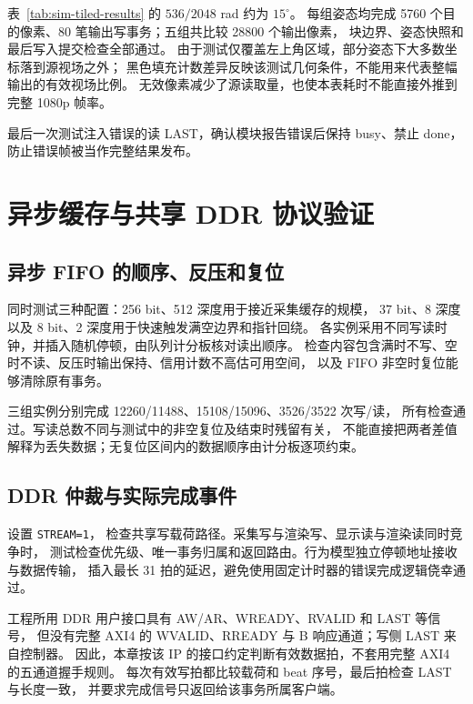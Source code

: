 表~\ref{tab:sim-tiled-results} 的 $536/2048$ rad 约为 $15^\circ$。
每组姿态均完成 5760 个目的像素、80 笔输出写事务；五组共比较 28800 个输出像素，
块边界、姿态快照和最后写入提交检查全部通过。
由于测试仅覆盖左上角区域，部分姿态下大多数坐标落到源视场之外；
黑色填充计数差异反映该测试几何条件，不能用来代表整幅输出的有效视场比例。
无效像素减少了源读取量，也使本表耗时不能直接外推到完整 1080p 帧率。

最后一次测试注入错误的读 LAST，确认模块报告错误后保持 busy、禁止 done，
防止错误帧被当作完整结果发布。

\section{异步缓存与共享 DDR 协议验证}
\subsection{异步 FIFO 的顺序、反压和复位}
 同时测试三种配置：256 bit、512 深度用于接近采集缓存的规模，
37 bit、8 深度以及 8 bit、2 深度用于快速触发满空边界和指针回绕。
各实例采用不同写读时钟，并插入随机停顿，由队列计分板核对读出顺序。
检查内容包含满时不写、空时不读、反压时输出保持、信用计数不高估可用空间，
以及 FIFO 非空时复位能够清除原有事务。

三组实例分别完成 12260/11488、15108/15096、3526/3522 次写/读，
所有检查通过。写读总数不同与测试中的非空复位及结束时残留有关，
不能直接把两者差值解释为丢失数据；无复位区间内的数据顺序由计分板逐项约束。

\subsection{DDR 仲裁与实际完成事件}
 设置 \texttt{STREAM=1}，
检查共享写载荷路径。采集写与渲染写、显示读与渲染读同时竞争时，
测试检查优先级、唯一事务归属和返回路由。行为模型独立停顿地址接收与数据传输，
插入最长 31 拍的延迟，避免使用固定计时器的错误完成逻辑侥幸通过。

工程所用 DDR 用户接口具有 AW/AR、WREADY、RVALID 和 LAST 等信号，
但没有完整 AXI4 的 WVALID、RREADY 与 B 响应通道；写侧 LAST 来自控制器。
因此，本章按该 IP 的接口约定判断有效数据拍，不套用完整 AXI4 的五通道握手规则。
每次有效写拍都比较载荷和 beat 序号，最后拍检查 LAST 与长度一致，
并要求完成信号只返回给该事务所属客户端。

